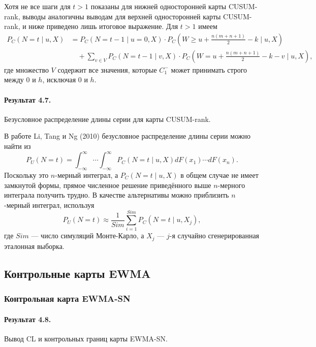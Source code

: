 Хотя не все шаги для \(t > 1\) показаны для нижней односторонней карты CUSUM-rank, выводы аналогичны выводам для верхней односторонней карты CUSUM-rank, и ниже приведено лишь итоговое выражение. Для \(t > 1\) имеем
\begin{align*}
	P_C\left( N = t \mid u, X \right)
	&= P_C\left( N = t - 1 \mid u = 0, X \right)\cdot P_C\left( W \ge u + \frac{n(m + n + 1)}{2} - k \mid u, X \right) \\
	&\quad + \sum_{v \in V} P_C\left( N = t - 1 \mid v, X \right)\cdot P_C\left( W = u + \frac{n(m + n + 1)}{2} - k - v \mid u, X \right),
\end{align*}
где множество \(V\) содержит все значения, которые \(C_1^-\) может принимать строго между 0 и \(h\), исключая 0 и \(h\).

\paragraph{Результат 4.7.} Безусловное распределение длины серии для карты CUSUM-rank.

В работе Li, Tang и Ng (2010) безусловное распределение длины серии можно найти из
\[
	P_U(N = t) = \int_{-\infty}^{\infty}\cdots\int_{-\infty}^{\infty} P_C\left( N = t \mid u, X \right) dF(x_1)\cdots dF(x_n).
\]
Поскольку это \(n\)-мерный интеграл, а \(P_C\left( N = t \mid u, X \right)\) в общем случае не имеет замкнутой формы, прямое численное решение приведённого выше \(n\)-мерного интеграла получить трудно. В качестве альтернативы можно приблизить \(n\)-мерный интеграл, используя
\[
	P_U(N = t) \approx \frac{1}{Sim}\sum_{i=1}^{Sim} P_C\left( N = t \mid u, X_j \right),
\]
где \(Sim\) --- число симуляций Монте-Карло, а \(X_j\) --- \(j\)-я случайно сгенерированная эталонная выборка.

\subsection{Контрольные карты EWMA}
\subsubsection{Контрольная карта EWMA-SN}

\paragraph{Результат 4.8.} Вывод CL и контрольных границ карты EWMA-SN.

